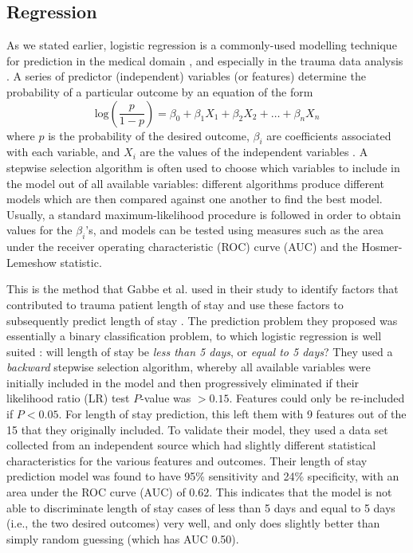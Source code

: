\subsection{Regression}
As we stated earlier, logistic regression is a commonly-used modelling
technique for prediction in the medical domain \citep{Tu1996}, and especially
in the trauma data analysis \citep{Gabbe2005}. A series of
predictor (independent) variables (or features) determine the probability of a
particular outcome by an equation of the form
\begin{equation}
\mathrm{log}\left(\frac{p}{1-p}\right) = \beta_0 + \beta_1X_1 + \beta_2X_2 + \dots + \beta_nX_n
\end{equation}
where $p$ is the probability of the desired outcome, $\beta_i$ are coefficients
associated with each variable, and $X_i$ are the values of the independent
variables \citep{Hosmer1989}. A stepwise selection algorithm is often used to
choose which variables to include in the model out of all available variables:
different algorithms produce different models which are then compared against
one another to find the best model. Usually, a standard maximum-likelihood
procedure is followed in order to obtain values for the $\beta_i$'s, and models
can be tested using measures such as the area under the receiver operating
characteristic (ROC) curve (AUC) and the Hosmer-Lemeshow statistic.

This is the method that Gabbe et al. used in their study to identify factors
that contributed to trauma patient length of stay and use these factors to
subsequently predict length of stay \citep{Gabbe2005}. The prediction problem
they proposed was essentially a binary classification problem, to which
logistic regression is well suited \citep{Tu1996}: will length of stay be
\textit{less than 5 days}, or \textit{equal to 5 days}? They used a
\textit{backward} stepwise selection algorithm, whereby all available variables
were initially included in the model and then progressively eliminated if their
likelihood ratio (LR) test $P$-value was $>0.15$. Features could only be
re-included if $P<0.05$. For length of stay
prediction, this left them with 9 features out of the 15 that they originally
included. To validate their model, they used a data set collected from an
independent source which had slightly different statistical characteristics for
the various features and outcomes. Their length of stay prediction model was
found to have 95\% sensitivity and 24\% specificity, with an area under the ROC
curve (AUC) of 0.62. This indicates that the model is not able to discriminate
length of stay cases of less than 5 days and equal to 5 days (i.e., the two
desired outcomes) very well, and only does
slightly better than simply random guessing (which has AUC 0.50).

